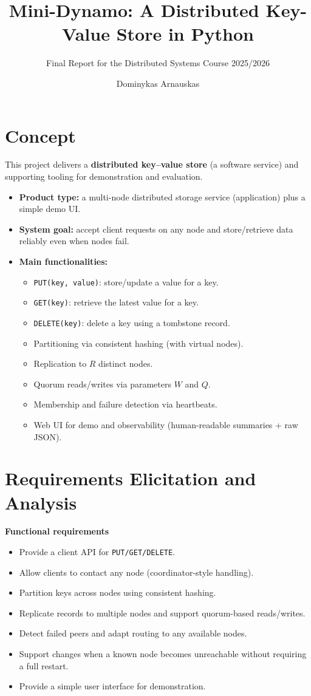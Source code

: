 \documentclass{scrartcl}
\title{\LARGE
    Mini-Dynamo: A Distributed Key-Value Store in Python
}
\subtitle{Final Report for the Distributed Systems Course 2025/2026}
\author{Dominykas Arnauskas\\\emailaddr{dominykas.arnauskas@studio.unibo.it}}
\date{}
\begin{document}
\maketitle

\section{Concept}\label{concept}

This project delivers a \textbf{distributed key--value store} (a software service) and supporting tooling for demonstration and evaluation.

\begin{itemize}
  \item \textbf{Product type:} a multi-node distributed storage service (application) plus a simple demo UI.
  \item \textbf{System goal:} accept client requests on any node and store/retrieve data reliably even when nodes fail.
  \item \textbf{Main functionalities:}
    \begin{itemize}
      \item \texttt{PUT(key, value)}: store/update a value for a key.
      \item \texttt{GET(key)}: retrieve the latest value for a key.
      \item \texttt{DELETE(key)}: delete a key using a tombstone record.
      \item Partitioning via consistent hashing (with virtual nodes).
      \item Replication to $R$ distinct nodes.
      \item Quorum reads/writes via parameters $W$ and $Q$.
      \item Membership and failure detection via heartbeats.
      \item Web UI for demo and observability (human-readable summaries + raw JSON).
    \end{itemize}
\end{itemize}

\section{Requirements Elicitation and Analysis}\label{requirements}

\textbf{Functional requirements}
\begin{itemize}
  \item Provide a client API for \texttt{PUT/GET/DELETE}.
  \item Allow clients to contact any node (coordinator-style handling).
  \item Partition keys across nodes using consistent hashing.
  \item Replicate records to multiple nodes and support quorum-based reads/writes.
  \item Detect failed peers and adapt routing to any available nodes.
  \item Support changes when a known node becomes unreachable without requiring a full restart.
  \item Provide a simple user interface for demonstration.
\end{itemize}
\end{document}
